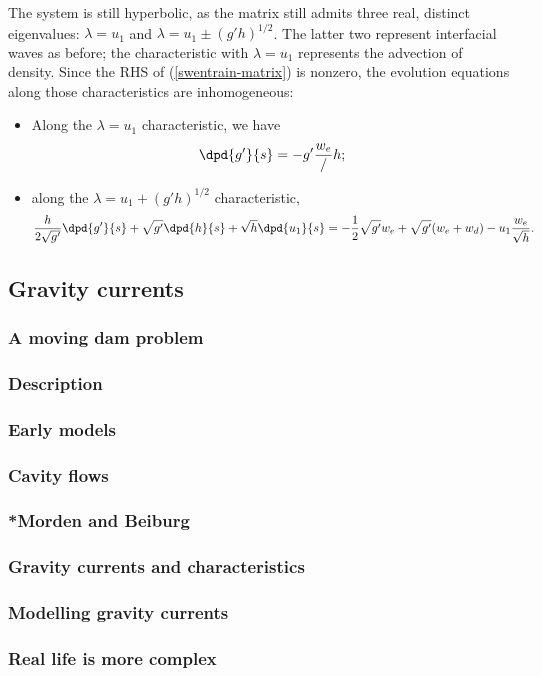 The system is still hyperbolic, as the matrix still admits three real, distinct eigenvalues: $\lambda = u_1$ and $\lambda = u_1 \pm (g'h)^{1/2}$. The latter two represent interfacial waves as before; the characteristic with $\lambda = u_1$ represents the advection of density. Since the RHS of (\ref{swentrain-matrix}) is nonzero, the evolution equations along those characteristics are inhomogeneous:
\begin{itemize}
	\item Along the $\lambda = u_1$ characteristic, we have
	\begin{equation}
		\dpd{g'}{s} = -g' \frac{w_e}/h;
	\end{equation}
	\item along the $\lambda = u_1 + (g'h)^{1/2}$ characteristic,
	\begin{equation}
		\frac{h}{2\sqrt{g'}} \dpd{g'}{s} + \sqrt{g'} \dpd{h}{s} + \sqrt{h} \dpd{u_1}{s}
		 = -\frac{1}{2}\sqrt{g'} w_e + \sqrt{g'} (w_e + w_d) - u_1 \frac{w_e}{\sqrt{h}}.
	\end{equation}
\end{itemize}


\subsection{Gravity currents}
\subsubsection{A moving dam problem}
\subsubsection{Description}
\subsubsection{Early models}
\subsubsection{Cavity flows}
\subsubsection{*Morden and Beiburg}
\subsubsection{Gravity currents and characteristics}
\subsubsection{Modelling gravity currents}
\subsubsection{Real life is more complex}
